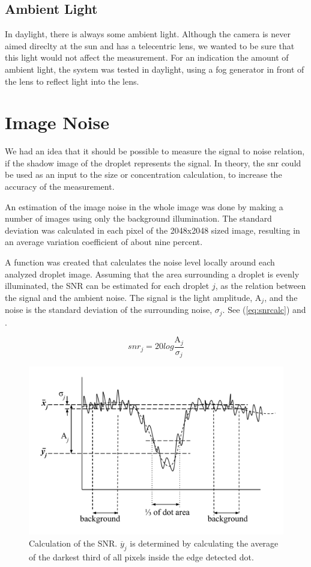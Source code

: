 \subsection{Ambient Light}

In daylight, there is always some ambient light. Although the camera is never aimed direclty at the sun and has a telecentric lens, we wanted to be sure that this light would not affect the measurement. For an indication the amount of ambient light, the system was tested in daylight, using a fog generator in front of the lens to reflect light into the lens. 

\section{Image Noise}

We had an idea that it should be possible to measure the signal to noise relation, if the shadow image of the droplet represents the signal. In theory, the \gls{snr} could be used as an input to the size or concentration calculation, to increase the accuracy of the measurement. 

An estimation of the image noise in the whole image was done by making a number of images using only the background illumination. The standard deviation was calculated in each pixel of the 2048x2048 sized image, resulting in an average variation coefficient of about nine percent.

A function was created that calculates the noise level locally around each analyzed droplet image. Assuming that the area surrounding a droplet is evenly illuminated, the SNR can be estimated for each droplet $j$, as the relation between the signal and the ambient noise. The signal is the light amplitude, A$_j$, and the noise is the standard deviation of the surrounding noise, $\sigma_j$. See (\ref{eq:snrcalc}) and .

\begin{equation}
snr_j = 20 log \frac{\text{A}_j}{\sigma_j}
\label{eq:snrcalc}
\end{equation}

\begin{figure}%
\centering\includegraphics[width=0.75\linewidth]{figures/snrcalc}
\caption{Calculation of the SNR. $\overline{y}_j$ is determined by calculating the average of the darkest third of all pixels inside the edge detected dot.}
\label{fig:snrcalc}
\end{figure}


